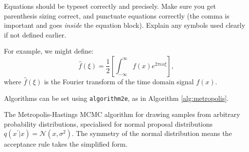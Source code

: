 \documentclass{l4proj}
\begin{document}
\clearpage


Equations should be typeset correctly and precisely. Make sure you get parenthesis sizing correct, and punctuate equations correctly 
(the comma is important and goes \textit{inside} the equation block). Explain any symbols used clearly if not defined earlier. 

For example, we might define:
\begin{equation}
    \hat{f}(\xi) = \frac{1}{2}\left[ \int_{-\infty}^{\infty} f(x) e^{2\pi i x \xi} \right],
\end{equation}    
where $\hat{f}(\xi)$ is the Fourier transform of the time domain signal $f(x)$.

Algorithms can be set using \texttt{algorithm2e}, as in Algorithm \ref{alg:metropolis}.

\begin{algorithm}
    \DontPrintSemicolon
    
\caption{The Metropolis-Hastings MCMC algorithm for drawing samples from arbitrary probability distributions, 
specialised for normal proposal distributions $q(x^\prime|x) = \mathcal{N}(x, \sigma^2)$. The symmetry of the normal distribution means the acceptance rule takes the simplified form.}\label{alg:metropolis}
\end{algorithm}
\end{document}
